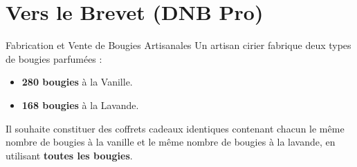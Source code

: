 \section{Vers le Brevet (DNB Pro)}

\begin{sujetdnb}{Fabrication et Vente de Bougies Artisanales}
Un artisan cirier fabrique deux types de bougies parfumées :
\begin{itemize}
    \item \textbf{280 bougies} à la Vanille.
    \item \textbf{168 bougies} à la Lavande.
\end{itemize}
Il souhaite constituer des coffrets cadeaux identiques contenant chacun le même nombre de bougies à la vanille et le même nombre de bougies à la lavande, en utilisant \textbf{toutes les bougies}.

\begin{center}
\end{center}


\end{sujetdnb}
